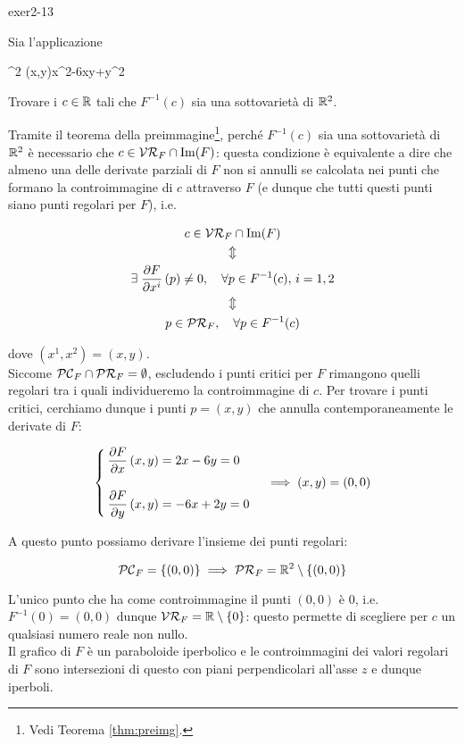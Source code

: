 {exer2-13}
{
Sia l'applicazione

	{\R^{2}}{\R}
	{(x,y)}{x^{2}-6xy+y^{2}}

Trovare i $ c \in \mathbb{R} $ tali che $ F^{-1}(c) $ sia una sottovarietà di $ \mathbb{R}^{2} $.
}
{
Tramite il teorema della preimmagine\footnote{%
	Vedi Teorema \ref{thm:preimg}.%
}, perché $ F^{-1}(c) $ sia una sottovarietà di $ \mathbb{R}^{2} $ è necessario che $ c \in \mathcal{VR}_{F} \cap \Im(F) $: questa condizione è equivalente a dire che almeno una delle derivate parziali di $ F $ non si annulli se calcolata nei punti che formano la controimmagine di $ c $ attraverso $ F $ (e dunque che tutti questi punti siano punti regolari per $ F $), i.e.

\begin{gather}
	c \in \VR_{F} \cap \Im(F) \nonumber \\
	\Updownarrow \nonumber \\
	\E \pdv{F}{x^{i}} \, (p) \neq 0 \qcomma \forall p \in F^{-1}(c), \, i=1,2 \\
	\Updownarrow \nonumber \\
	p \in \PR_{F} \qcomma \forall p \in F^{-1}(c) \nonumber
\end{gather}

dove $ (x^{1},x^{2}) = (x,y) $. \\
Siccome $ \mathcal{PC}_{F} \cap \mathcal{PR}_{F} = \emptyset $, escludendo i punti critici per $ F $ rimangono quelli regolari tra i quali individueremo la controimmagine di $ c $. Per trovare i punti critici, cerchiamo dunque i punti $ p = (x,y) $ che annulla contemporaneamente le derivate di $ F $:

\begin{equation}
	\begin{cases}
		\dpdv{F}{x} \, (x,y) = 2 x - 6 y = 0 \\ \\
		\dpdv{F}{y} \, (x,y) = - 6 x + 2 y = 0
	\end{cases} %
	\implies %
	(x,y) = (0,0)
\end{equation}

A questo punto possiamo derivare l'insieme dei punti regolari:

\begin{equation}
	\PC_{F} = \{(0,0)\} %
	\implies %
	\PR_{F} = \R^{2} \setminus \{(0,0)\}
\end{equation}

L'unico punto che ha come controimmagine il punti $ (0,0) $ è $ 0 $, i.e. $ F^{-1}(0) = (0,0) $ dunque $ \mathcal{VR}_{F} = \mathbb{R} \setminus \{0\} $: questo permette di scegliere per $ c $ un qualsiasi numero reale non nullo. \\
Il grafico di $ F $ è un paraboloide iperbolico e le controimmagini dei valori regolari di $ F $ sono intersezioni di questo con piani perpendicolari all'asse $ z $ e dunque iperboli.
}


